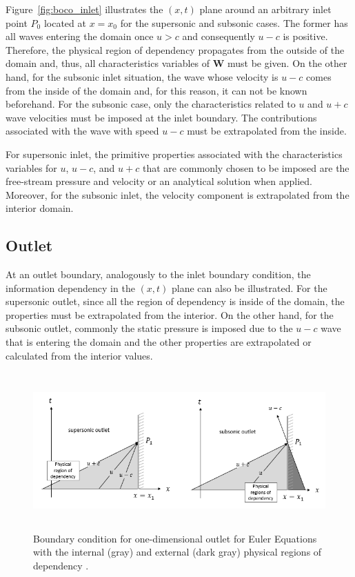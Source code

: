 Figure\ \ref{fig:boco_inlet} illustrates the $(x, t)$ plane around an arbitrary inlet point $P_0$ located at $x = x_0$ for the supersonic and subsonic cases. The former has all waves entering the domain once $u > c$ and consequently $u-c$ is positive. Therefore, the physical region of dependency propagates from the outside of the domain and, thus, all characteristics variables of $\textbf{W}$ must be given. On the other hand, for the subsonic inlet situation, the wave whose velocity is $u-c$ comes from the inside of the domain and, for this reason, it can not be known beforehand. For the subsonic case, only the characteristics related to $u$ and $u+c$ wave velocities must be imposed at the inlet boundary. The contributions associated with the wave with speed $u-c$ must be extrapolated from the inside. 

For supersonic inlet, the primitive properties associated with the characteristics variables for $u$,  $u-c$, and $u+c$ that are commonly chosen to be imposed are the free-stream pressure and velocity or an analytical solution when applied. Moreover, for the subsonic inlet, the velocity component is extrapolated from the interior domain.

\subsection{Outlet}
At an outlet boundary, analogously to the inlet boundary condition, the information dependency in the $(x, t)$ plane can also be illustrated. For the supersonic outlet, since all the region of dependency is inside of the domain, the properties must be extrapolated from the interior. On the other hand, for the subsonic outlet, commonly the static pressure is imposed due to the $u-c$ wave that is entering the domain and the other properties are extrapolated or calculated from the interior values.
%
\begin{figure}[htb!]
	\centering
		\includegraphics[height=6.0cm]{figs/boco_outlet_v2.png}
\caption{Boundary condition for one-dimensional outlet for Euler Equations with the internal (gray) and external (dark gray) physical regions of dependency \cite{Hirsch1991}.}
\label{fig:boco_outlet}
\end{figure}


